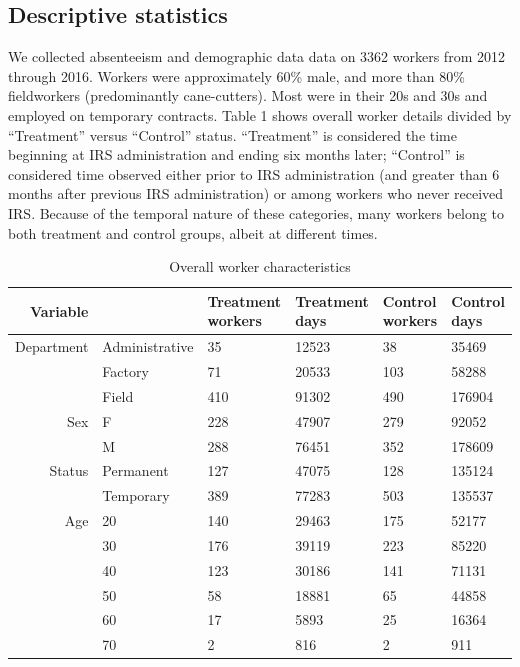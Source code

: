 \documentclass[]{article}
\begin{document}
\subsection{Descriptive statistics}\label{descriptive-statistics}

We collected absenteeism and demographic data data on 3362 workers from
2012 through 2016. Workers were approximately 60\% male, and more than
80\% fieldworkers (predominantly cane-cutters). Most were in their 20s
and 30s and employed on temporary contracts. Table 1 shows overall
worker details divided by ``Treatment'' versus ``Control'' status.
``Treatment'' is considered the time beginning at IRS administration and
ending six months later; ``Control'' is considered time observed either
prior to IRS administration (and greater than 6 months after previous
IRS administration) or among workers who never received IRS. Because of
the temporal nature of these categories, many workers belong to both
treatment and control groups, albeit at different times.

\begin{table}[ht]
\centering
\begin{tabular}{rlllll}
  \hline
Variable &   & Treatment workers & Treatment days & Control workers & Control days \\ 
  \hline
Department & Administrative &  35 & 12523 &  38 & 35469 \\ 
   & Factory &  71 & 20533 & 103 & 58288 \\ 
   & Field & 410 & 91302 & 490 & 176904 \\ 
  Sex & F & 228 & 47907 & 279 & 92052 \\ 
   & M & 288 & 76451 & 352 & 178609 \\ 
  Status & Permanent & 127 & 47075 & 128 & 135124 \\ 
   & Temporary & 389 & 77283 & 503 & 135537 \\ 
  Age & 20 & 140 & 29463 & 175 & 52177 \\ 
   & 30 & 176 & 39119 & 223 & 85220 \\ 
   & 40 & 123 & 30186 & 141 & 71131 \\ 
   & 50 &  58 & 18881 &  65 & 44858 \\ 
   & 60 &  17 & 5893 &  25 & 16364 \\ 
   & 70 &   2 & 816 &   2 & 911 \\ 
   \hline
\end{tabular}
\caption{Overall worker characteristics} 
\end{table}
\end{document}
